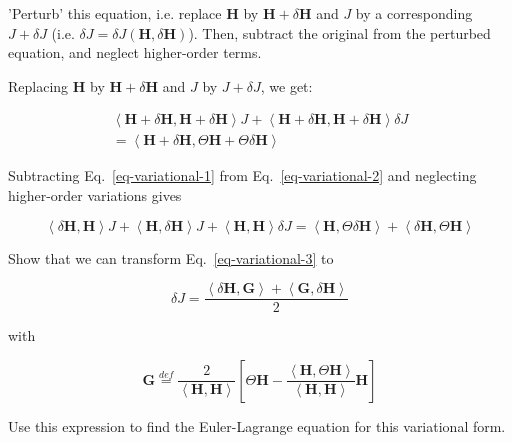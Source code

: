 \begin{cue}
'Perturb' this equation, i.e. replace ${\mathbf H}$ by ${\mathbf H} + \delta {\mathbf H}$ and $J$ by a corresponding $J+ \delta J$ (i.e. $\delta J=\delta J({\mathbf H},\delta {\mathbf H})$). Then, subtract the original from the perturbed equation, and neglect higher-order terms.  
\end{cue}

Replacing ${\mathbf H}$ by ${\mathbf H} + \delta {\mathbf H}$ and $J$ by $J+ \delta J$, we get:

\begin{align}
\left\langle {\mathbf H + \delta {\mathbf H}},{\mathbf H}+\delta {\mathbf H} \right\rangle J + \left\langle {\mathbf H}+\delta {\mathbf H},{\mathbf H+\delta {\mathbf H}} \right\rangle \delta  J \nonumber  \\
  = \left\langle {\mathbf H}+\delta {\mathbf H},\Theta {\mathbf H} + \Theta \delta {\mathbf H} \right\rangle
\label{eq-variational-2}
\end{align} 

Subtracting Eq.~\ref{eq-variational-1} from Eq.~\ref{eq-variational-2} and neglecting higher-order variations gives


\begin{equation}
\left\langle \delta {\mathbf H},{\mathbf H} \right\rangle J + \left\langle {\mathbf H},\delta {\mathbf H} \right\rangle J + \left\langle {\mathbf H}, {\mathbf H} \right\rangle \delta J = \left\langle {\mathbf H},\Theta \delta {\mathbf H} \right\rangle + \left\langle \delta {\mathbf H},\Theta {\mathbf H} \right\rangle \label{eq-variational-3}
\end{equation} 


\pagebreak

\begin{exer}
Show that we can transform Eq.~\ref{eq-variational-3} to

$$\delta J = \frac {\left\langle \delta {\mathbf H} , {\mathbf G} \right\rangle + \left\langle {\mathbf G} , \delta {\mathbf H} \right\rangle}{2}$$

with

$${\mathbf G} \stackrel{def}{=} \frac{2}{\left\langle {\mathbf H} , {\mathbf H}\right\rangle } \left[ \Theta {\mathbf H} - \frac{\left\langle {\mathbf H} , \Theta {\mathbf H}\right\rangle}{\left\langle {\mathbf H} , {\mathbf H}\right\rangle} {\mathbf H} \right]  $$
\end{exer}

\begin{cue}
Use this expression to find the Euler-Lagrange equation for this variational form.  
\end{cue}

